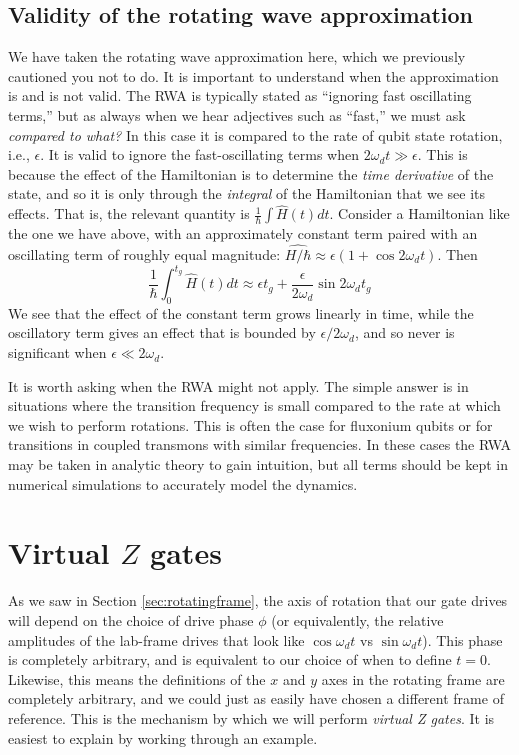 \subsection{Validity of the rotating wave approximation}
We have taken the rotating wave approximation here, which we previously cautioned you not to do. It is important to understand when the approximation is and is not valid. The RWA is typically stated as ``ignoring fast oscillating terms,'' but as always when we hear adjectives such as ``fast,'' we must ask \textit{compared to what?} In this case it is compared to the rate of qubit state rotation, i.e., $\epsilon$. It is valid to ignore the fast-oscillating terms when $2\omega_d t \gg \epsilon$. This is because the effect of the Hamiltonian is to determine the \textit{time derivative} of the state, and so it is only through the \textit{integral} of the Hamiltonian that we see its effects. That is, the relevant quantity is $\frac{1}{\hbar}\int\hat{H}(t)dt$. Consider a Hamiltonian like the one we have above, with an approximately constant term paired with an oscillating term of roughly equal magnitude: $\hat{H/\hbar}\approx \epsilon (1+\cos2\omega_d t)$. Then
\begin{equation*}
    \frac{1}{\hbar}\int_0^{t_g} \hat{H}(t)dt \approx \epsilon t_g + \frac{\epsilon}{2\omega_d}\sin 2\omega_dt_g
\end{equation*}
We see that the effect of the constant term grows linearly in time, while the oscillatory term gives an effect that is bounded by $\epsilon/2\omega_d$, and so never is significant when $\epsilon \ll 2\omega_d$. 

It is worth asking when the RWA might not apply. The simple answer is in situations where the transition frequency is small compared to the rate at which we wish to perform rotations. This is often the case for fluxonium qubits or for transitions in coupled transmons with similar frequencies. In these cases the RWA may be taken in analytic theory to gain intuition, but all terms should be kept in numerical simulations to accurately model the dynamics.

\section{Virtual $Z$ gates}
\label{sec:virtualgates}
As we saw in Section \ref{sec:rotatingframe}, the axis of rotation that our gate drives will depend on the choice of drive phase $\phi$ (or equivalently, the relative amplitudes of the lab-frame drives that look like $\cos\omega_d t$ vs $\sin\omega_dt$). This phase is completely arbitrary, and is equivalent to our choice of when to define $t=0$. Likewise, this means the definitions of the $x$ and $y$ axes in the rotating frame are completely arbitrary, and we could just as easily have chosen a different frame of reference. This is the mechanism by which we will perform \textit{virtual Z gates}. It is easiest to explain by working through an example.

